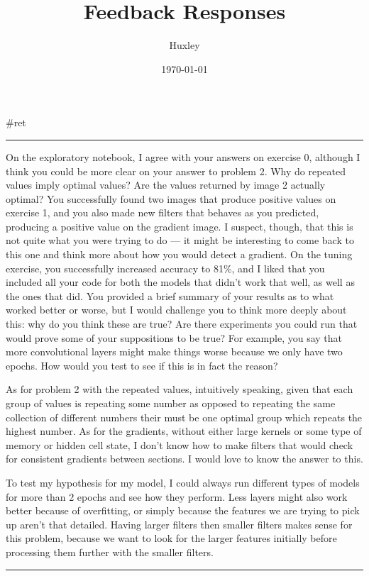 \documentclass[letterpaper]{article}
\author{Huxley}
\date{\today}
\title{Feedback Responses}
\renewcommand{\tableofcontents}{}
\begin{document}
\tableofcontents

\#ret

\noindent\rule{\textwidth}{0.5pt}

On the exploratory notebook, I agree with your answers on exercise 0,
although I think you could be more clear on your answer to problem 2.
Why do repeated values imply optimal values? Are the values returned by
image 2 actually optimal? You successfully found two images that produce
positive values on exercise 1, and you also made new filters that
behaves as you predicted, producing a positive value on the gradient
image. I suspect, though, that this is not quite what you were trying to
do --- it might be interesting to come back to this one and think more
about how you would detect a gradient. On the tuning exercise, you
successfully increased accuracy to 81\%, and I liked that you included
all your code for both the models that didn't work that well, as well as
the ones that did. You provided a brief summary of your results as to
what worked better or worse, but I would challenge you to think more
deeply about this: why do you think these are true? Are there
experiments you could run that would prove some of your suppositions to
be true? For example, you say that more convolutional layers might make
things worse because we only have two epochs. How would you test to see
if this is in fact the reason?

As for problem 2 with the repeated values, intuitively speaking, given
that each group of values is repeating some number as opposed to
repeating the same collection of different numbers their must be one
optimal group which repeats the highest number. As for the gradients,
without either large kernels or some type of memory or hidden cell
state, I don't know how to make filters that would check for consistent
gradients between sections. I would love to know the answer to this.

To test my hypothesis for my model, I could always run different types
of models for more than 2 epochs and see how they perform. Less layers
might also work better because of overfitting, or simply because the
features we are trying to pick up aren't that detailed. Having larger
filters then smaller filters makes sense for this problem, because we
want to look for the larger features initially before processing them
further with the smaller filters.

\noindent\rule{\textwidth}{0.5pt}
\end{document}
